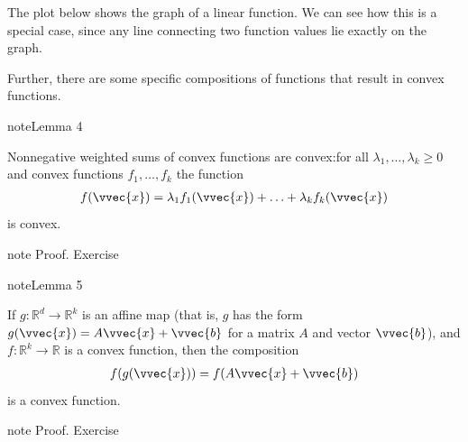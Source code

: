 \documentclass[letterpaper,10pt,english]{jupyterBook}
\begin{document}
\sphinxAtStartPar
The plot below shows the graph of a linear function. We can see how this is a special case, since any line connecting two function values lie exactly on the graph.
\begin{center}\end{center}
\sphinxAtStartPar
Further, there are some specific compositions of functions that result in convex functions.
\label{optimization_convex:lemma-9}
\begin{sphinxadmonition}{note}{Lemma 4}



\sphinxAtStartPar
Nonnegative weighted sums of convex functions are convex:for all \(\lambda_1,\ldots,\lambda_k\geq 0\) and convex functions \(f_1,\ldots,f_k\) the function
\begin{equation*}
\begin{split}f(\vvec{x}) = \lambda_1 f_1(\vvec{x})+\ldots + \lambda_k f_k(\vvec{x})\end{split}
\end{equation*}
is convex.
\end{sphinxadmonition}

\begin{sphinxadmonition}{note}
\sphinxAtStartPar
Proof. Exercise
\end{sphinxadmonition}
\label{optimization_convex:lemma-10}
\begin{sphinxadmonition}{note}{Lemma 5}



\sphinxAtStartPar
If \(g:\mathbb{R}^d\rightarrow \mathbb{R}^k\) is an affine map (that is, \(g\) has the form \(g(\vvec{x})=A\vvec{x}+\vvec{b}\) for a matrix \(A\) and vector \(\vvec{b}\)), and \(f:\mathbb{R}^k\rightarrow \mathbb{R}\) is a convex function, then the composition
\begin{equation*}
\begin{split}f(g(\vvec{x}))=f(A\vvec{x}+\vvec{b})\end{split}
\end{equation*}
is a convex function.
\end{sphinxadmonition}

\begin{sphinxadmonition}{note}
\sphinxAtStartPar
Proof. Exercise
\end{sphinxadmonition}
\end{document}
